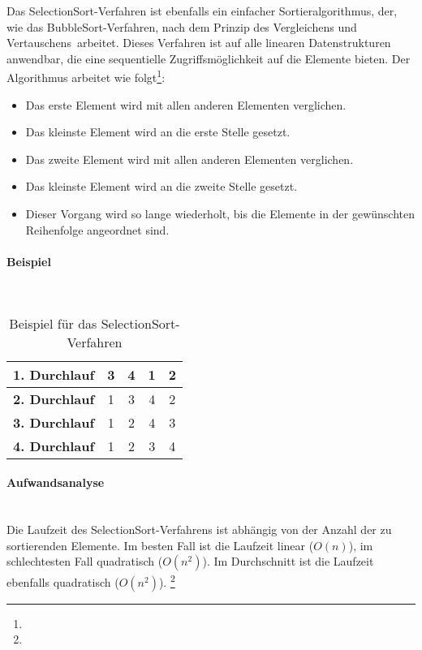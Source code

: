 \documentclass[./entry.tex]{subfiles}
\begin{document}
    Das \dq SelectionSort\dq-Verfahren ist ebenfalls ein einfacher Sortieralgorithmus,
    der, wie das \dq BubbleSort\dq-Verfahren, nach dem Prinzip des \dq Vergleichens und Vertauschens\dq\ arbeitet.
    Dieses Verfahren ist auf alle linearen Datenstrukturen anwendbar,
    die eine sequentielle Zugriffsmöglichkeit auf die Elemente bieten.
    Der Algorithmus arbeitet wie folgt\footnote{}:
    \begin{itemize}
        \item Das erste Element wird mit allen anderen Elementen verglichen.
        \item Das kleinste Element wird an die erste Stelle gesetzt.
        \item Das zweite Element wird mit allen anderen Elementen verglichen.
        \item Das kleinste Element wird an die zweite Stelle gesetzt.
        \item Dieser Vorgang wird so lange wiederholt, bis die Elemente in der gewünschten Reihenfolge angeordnet sind.
    \end{itemize}

    \paragraph{Beispiel} \mbox{}\\
    \begin{table}[h]
        \centering
        \begin{tabular}{|c|c|c|c|c|}
            \hline
            \textbf{1. Durchlauf} & 3 & 4 & 1 & 2 \\
            \hline
            \textbf{2. Durchlauf} & 1 & 3 & 4 & 2 \\
            \hline
            \textbf{3. Durchlauf} & 1 & 2 & 4 & 3 \\
            \hline
            \textbf{4. Durchlauf} & 1 & 2 & 3 & 4 \\
            \hline
        \end{tabular}
        \caption{Beispiel für das \dq SelectionSort\dq-Verfahren}
        \label{tab:selectionsort}
    \end{table}

    \paragraph{Aufwandsanalyse} \mbox{}\\
    Die Laufzeit des \dq SelectionSort\dq-Verfahrens ist abhängig von der Anzahl der zu sortierenden Elemente.
    Im besten Fall ist die Laufzeit linear ($O(n)$), im schlechtesten Fall quadratisch ($O(n^2)$).
    Im Durchschnitt ist die Laufzeit ebenfalls quadratisch ($O(n^2)$).
    \footnote{}
\end{document}
